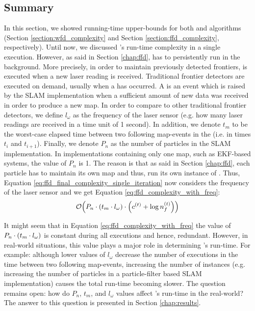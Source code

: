 \subsection{Summary}
In this section, we showed running-time upper-bounds for both \WFD and \FFD
algorithms (Section \ref{section:wfd_complexity} and Section
\ref{section:ffd_complexity}, respectively).
Until now, we discussed \FFD's run-time complexity in a single execution.
However, as said in Section \ref{chap:ffd}, \FFD has to persistently run in the
background. More precisely, in order to maintain previously detected frontiers,
\FFD is executed when a new laser reading is received. Traditional frontier
detectors are executed on demand, usually when a \emph{\mapevent} has occurred.
A \emph{\mapevent} is an event which is raised by the SLAM implementation
when a sufficient amount of new data was received in order to produce a new map.
In order to compare \FFD to other traditional frontier detectors, we define
$l_\omega$ as the frequency of the laser sensor (e.g. how many laser readings
are received in a time unit of 1 second). In addition, we denote $t_{m}$ to be
the worst-case elapsed time between two following map-events in the (i.e. in
times $t_i$ and $t_{i+1}$).  Finally, we denote $P_n$ as the number of particles
in the SLAM implementation. In implementations containing only one map, such as
EKF-based systems, the value of $P_n$ is 1. The reason is that as said in
Section \ref{chap:ffd}, each particle has to maintain its own map and thus, run
its own instance of \FFD. Thus, Equation
\eqref{eq:ffd_final_complexity_single_iteration} now considers the frequency of
the laser sensor and we get Equation \eqref{eq:ffd_complexity_with_freq}:
\begin{equation}\label{eq:ffd_complexity_with_freq}
\mathcal{O}{\left(P_n\cdot {\left(t_m \cdot l_\omega\right)} \cdot{\left(c^{\left(t\right)} +
        \log{n_f^{\left(t\right)}}\right)}\right)}
\end{equation}

It might seem that in Equation \eqref{eq:ffd_complexity_with_freq} the value of
$P_n\cdot {\left(t_m \cdot l_\omega\right)}$ is constant during all \FFD executions and
hence, redundant. However, in real-world situations, this value plays a major
role in determining \FFD's run-time. For example:
although lower values of $l_\omega$ decrease the number of \FFD executions in
the time between two following map-events, increasing the number of \FFD
instances (e.g. increasing the number of particles in a particle-filter based
SLAM implementation) causes the total run-time becoming slower. The question
remains open: how do $P_n$, $t_m$, and $l_\omega$ values affect \FFD's
run-time in the real-world?
The answer to this question is presented in Section \ref{chap:results}.


